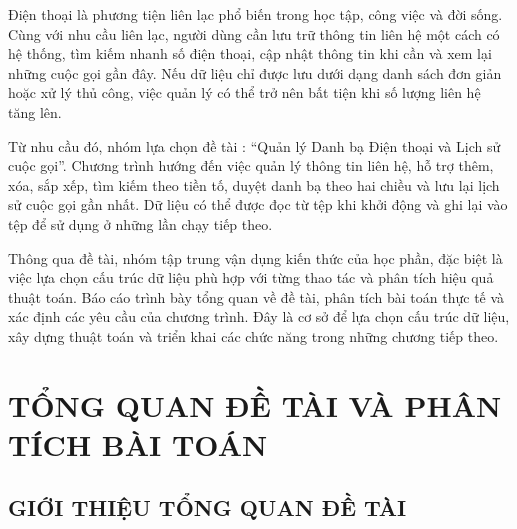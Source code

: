 \documentclass[12pt,a4paper]{report}
\begin{document}
Điện thoại là phương tiện liên lạc phổ biến trong học tập, công việc và đời sống. Cùng với nhu cầu liên lạc, người dùng cần lưu trữ thông tin liên hệ một cách có hệ thống, tìm kiếm nhanh số điện thoại, cập nhật thông tin khi cần và xem lại những cuộc gọi gần đây. Nếu dữ liệu chỉ được lưu dưới dạng danh sách đơn giản hoặc xử lý thủ công, việc quản lý có thể trở nên bất tiện khi số lượng liên hệ tăng lên.\par
Từ nhu cầu đó, nhóm lựa chọn đề tài : “Quản lý Danh bạ Điện thoại và Lịch sử cuộc gọi”. Chương trình hướng đến việc quản lý thông tin liên hệ, hỗ trợ thêm, xóa, sắp xếp, tìm kiếm theo tiền tố, duyệt danh bạ theo hai chiều và lưu lại lịch sử cuộc gọi gần nhất. Dữ liệu có thể được đọc từ tệp khi khởi động và ghi lại vào tệp để sử dụng ở những lần chạy tiếp theo.\par
Thông qua đề tài, nhóm tập trung vận dụng kiến thức của học phần, đặc biệt là việc lựa chọn cấu trúc dữ liệu phù hợp với từng thao tác và phân tích hiệu quả thuật toán. Báo cáo trình bày tổng quan về đề tài, phân tích bài toán thực tế và xác định các yêu cầu của chương trình. Đây là cơ sở để lựa chọn cấu trúc dữ liệu, xây dựng thuật toán và triển khai các chức năng trong những chương tiếp theo.\par
\chapter{TỔNG QUAN ĐỀ TÀI VÀ PHÂN TÍCH BÀI TOÁN}

\section{GIỚI THIỆU TỔNG QUAN ĐỀ TÀI}
\end{document}
